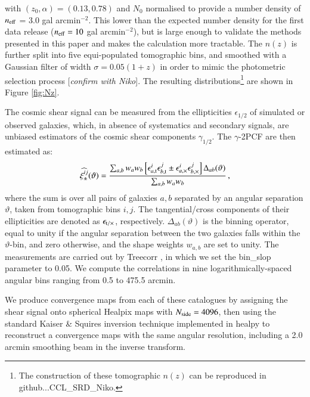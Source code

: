 \documentclass[useAMS,usenatbib]{mn2e}
\begin{document}
with $(z_0, \alpha) = (0.13, 0.78)$ and $N_0$ normalised to provide a number density of $n_{\rm eff}$ = 3.0 gal arcmin$^{-2}$. This lower than the expected number density for the first data release ($n_{\rm eff}=10$ gal arcmin$^{-2}$), but is large enough to validate the methods presented in this paper and makes the calculation more tractable. The $n(z)$ is further split into five equi-populated tomographic bins, and smoothed with a Gaussian filter of width $\sigma = 0.05(1+z)$ in order to mimic the photometric selection process [{\it confirm with Niko}].  The resulting distributions\footnote{The construction of these tomographic $n(z)$ can be reproduced in {github...CCL\_SRD\_Niko}.} are shown in Figure \ref{fig:Nz}. 

The cosmic shear signal can be measured from the ellipticities $\epsilon_{1/2}$ of simulated or observed galaxies, which, in absence of systematics and secondary signals, are unbiased estimators  of the cosmic shear components $\gamma_{1/2}$. The $\gamma$-2PCF are then estimated as:
 \begin{eqnarray}
 \widehat{\xi_{\pm}^{ij}}(\vartheta) = \frac{\sum_{a,b} w_a w_b \left[\epsilon_{a, \rm t}^i\epsilon_{b, \rm t}^j     \pm \epsilon_{a, \times}^i\epsilon_{b, \times}^j    \right]\Delta_{ab}(\vartheta)}{\sum_{a,b} w_a w_b} \, ,
 \label{eq:2PCF_estimator}
  \end{eqnarray}
where the sum is over all pairs of galaxies $a,b$ separated by an angular separation $\vartheta$, taken from tomographic bins $i,j$. The tangential/cross components of their ellipticities are denoted as $\epsilon_{\rm t/\times}$, respectively. 
$\Delta_{ab}(\vartheta)$ is the binning operator, equal to unity if the angular separation between the two galaxies falls within the $\vartheta$-bin, and zero otherwise, and the shape weights $w_{a,b}$ are set to unity. The measurements are carried out by {\sc Treecorr} \citep{TreeCorr}, in which we set the {\sc bin\_slop} parameter to 0.05. We compute the correlations in nine logarithmically-spaced angular bins ranging from 0.5 to 475.5 arcmin. 
 
We  produce convergence maps from each of these catalogues by assigning the shear signal onto spherical {\sc Healpix} maps \citep{healpix} with $N_{\rm side}=4096$, then using the standard Kaiser \& Squires inversion technique \citep{KaiserSquires} implemented in {\sc healpy} to reconstruct a convergence maps with the same angular resolution, including a 2.0 arcmin smoothing beam in the inverse transform.
 
\end{document}
